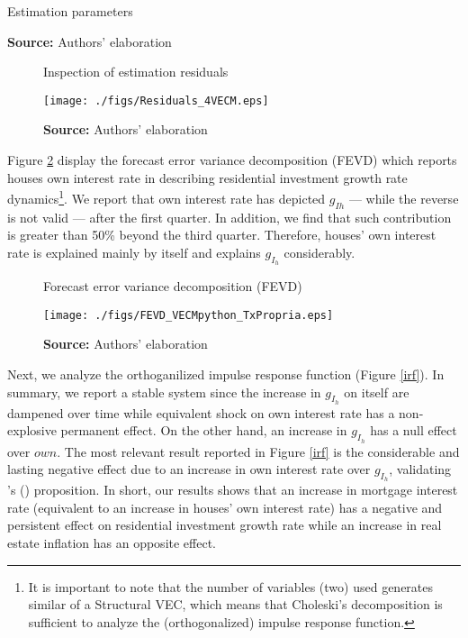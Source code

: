 \begin{table}[h!]
	\caption{Estimation parameters}
	\centering
	
	\caption*{\textbf{Source:} Authors' elaboration}
\end{table}

\begin{figure}
	\centering
	\caption{Inspection of estimation residuals}
	\label{residuos}
	\texttt{[image: ./figs/Residuals\_4VECM.eps]}
	\caption*{\textbf{Source:} Authors' elaboration}
\end{figure}


Figure \ref{fevd} display the forecast error variance decomposition (FEVD) which reports houses own interest rate in describing residential investment growth rate dynamics\footnote{
	It is important to note that the number of variables (two) used generates similar  of a Structural VEC, which means that Choleski's decomposition
	is sufficient to analyze the (orthogonalized) impulse response function.
}.
We report that own interest rate has  depicted  $g_{Ih}$ --- while the reverse is not valid --- after the first quarter.
In addition, we find that such contribution is greater than 50\% beyond the third quarter.
Therefore, houses' own interest rate is explained mainly by itself and explains $g_{I_h}$ considerably.


\begin{figure}[H]
	\centering
	\caption{Forecast error variance decomposition (FEVD)}
	\label{fevd}
	\texttt{[image: ./figs/FEVD\_VECMpython\_TxPropria.eps]}
	\caption*{\textbf{Source:} Authors' elaboration}
\end{figure}

Next, we analyze the orthoganilized impulse response function (Figure \ref{irf}).
In summary, we report a stable system since the increase in $g_{I_h}$ on itself are dampened over time while equivalent shock on own interest rate has a non-explosive permanent effect.
On the other hand, an increase in $g_{I_h}$ has a null effect over $own$.
The most relevant result reported in Figure \ref{irf} is the considerable and lasting negative effect due to an increase in own interest rate over $g_{I_h}$, validating \citeauthor{teixeira_crescimento_2015}'s (\citeyear{teixeira_crescimento_2015}) proposition.
In short, our results shows that an increase in mortgage interest rate (equivalent to an increase in houses' own interest rate) has a negative and persistent effect on residential investment growth rate while an increase in real estate inflation  has an opposite effect.

